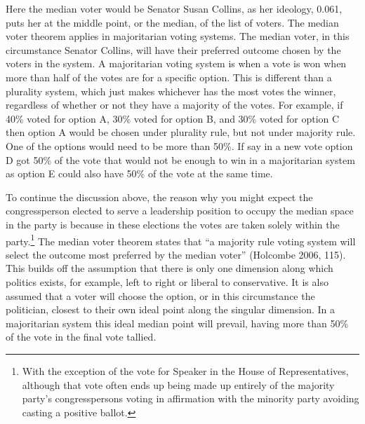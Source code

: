 \documentclass[12pt,twoside]{reedthesis}
\begin{document}
  Here the median voter would be Senator Susan Collins, as her ideology,
  0.061, puts her at the middle point, or the median, of the list of
  voters. The median voter theorem applies in majoritarian voting systems.
  The median voter, in this circumstance Senator Collins, will have their
  preferred outcome chosen by the voters in the system. A majoritarian
  voting system is when a vote is won when more than half of the votes are
  for a specific option. This is different than a plurality system, which
  just makes whichever has the most votes the winner, regardless of
  whether or not they have a majority of the votes. For example, if 40\%
  voted for option A, 30\% voted for option B, and 30\% voted for option C
  then option A would be chosen under plurality rule, but not under
  majority rule. One of the options would need to be more than 50\%. If
  say in a new vote option D got 50\% of the vote that would not be enough
  to win in a majoritarian system as option E could also have 50\% of the
  vote at the same time.
  
  To continue the discussion above, the reason why you might expect the
  congressperson elected to serve a leadership position to occupy the
  median space in the party is because in these elections the votes are
  taken solely within the party.\footnote{With the exception of the vote
    for Speaker in the House of Representatives, although that vote often
    ends up being made up entirely of the majority party's congresspersons
    voting in affirmation with the minority party avoiding casting a
    positive ballot.} The median voter theorem states that ``a majority
  rule voting system will select the outcome most preferred by the median
  voter'' (Holcombe 2006, 115). This builds off the assumption that there
  is only one dimension along which politics exists, for example, left to
  right or liberal to conservative. It is also assumed that a voter will
  choose the option, or in this circumstance the politician, closest to
  their own ideal point along the singular dimension. In a majoritarian
  system this ideal median point will prevail, having more than 50\% of
  the vote in the final vote tallied.
  
\end{document}
